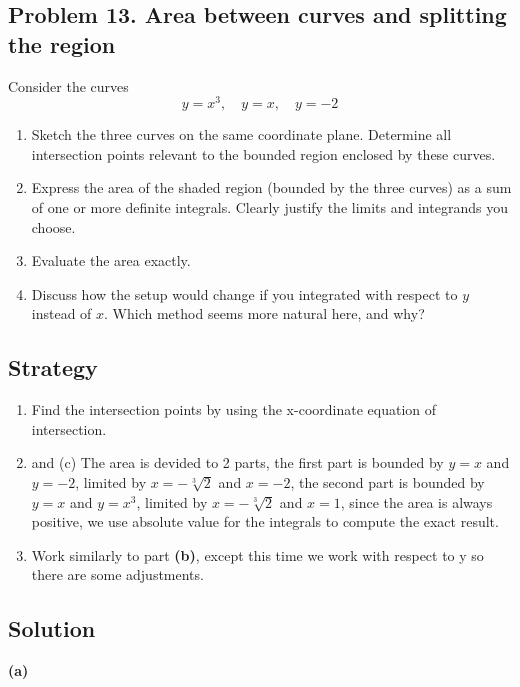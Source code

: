 \subsection{Problem 13. Area between curves and splitting the region}
Consider the curves
\[y=x^{3}, \quad y=x, \quad y=-2\]
\begin{enumerate}[label=(\alph*)]
    \item Sketch the three curves on the same coordinate plane. Determine all intersection points relevant to the bounded region enclosed by these curves.
    \item Express the area of the shaded region (bounded by the three curves) as a sum of one or more definite integrals. Clearly justify the limits and integrands you choose.
    \item Evaluate the area exactly.
    \item Discuss how the setup would change if you integrated with respect to $y$ instead of $x$. Which method seems more natural here, and why?
\end{enumerate}
\subsection*{Strategy}

\begin{enumerate}[label=(\alph*)]
    \item Find the intersection points by using the x-coordinate equation of intersection. \\
    \item and (c) The area is devided to 2 parts, the first part is bounded by $y = x$ and $y = -2$, limited by $x = -\sqrt[3]{2}$ and $x = -2$, the second part is bounded by $y = x$ and $y = x^3$, limited by $x = -\sqrt[3]{2}$ and $x = 1$, since the area is always positive, we use absolute value for the integrals to compute the exact result. \\
    \addtocounter{enumi}{1}
    \item Work similarly to part \textbf{(b)}, except this time we work with respect to y so there are some adjustments.
\end{enumerate}

\subsection*{Solution}

\textbf{(a)}

